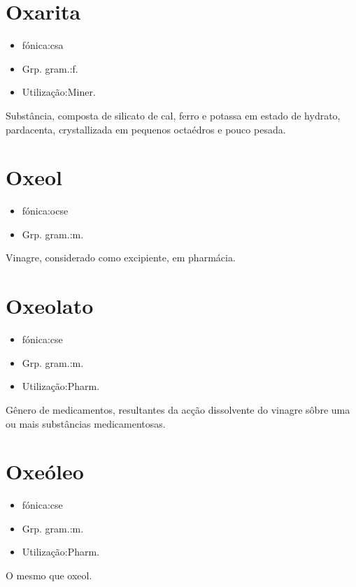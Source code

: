 \section{Oxarita}
\begin{itemize}
\item {fónica:csa}
\end{itemize}
\begin{itemize}
\item {Grp. gram.:f.}
\end{itemize}
\begin{itemize}
\item {Utilização:Miner.}
\end{itemize}
Substância, composta de silicato de cal, ferro e potassa em estado de hydrato, pardacenta, crystallizada em pequenos octaédros e pouco pesada.
\section{Oxeol}
\begin{itemize}
\item {fónica:ocse}
\end{itemize}
\begin{itemize}
\item {Grp. gram.:m.}
\end{itemize}
Vinagre, considerado como excipiente, em pharmácia.
\section{Oxeolato}
\begin{itemize}
\item {fónica:cse}
\end{itemize}
\begin{itemize}
\item {Grp. gram.:m.}
\end{itemize}
\begin{itemize}
\item {Utilização:Pharm.}
\end{itemize}
Gênero de medicamentos, resultantes da acção dissolvente do vinagre sôbre uma ou mais substâncias medicamentosas.
\section{Oxeóleo}
\begin{itemize}
\item {fónica:cse}
\end{itemize}
\begin{itemize}
\item {Grp. gram.:m.}
\end{itemize}
\begin{itemize}
\item {Utilização:Pharm.}
\end{itemize}
O mesmo que \textunderscore oxeol\textunderscore .
